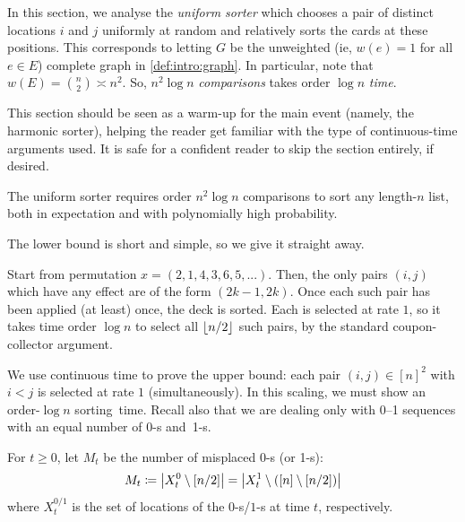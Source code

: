 \documentclass{article}
\begin{document}
In this section, we analyse the \textit{uniform sorter} which chooses a pair of distinct locations $i$ and $j$ uniformly at random and relatively sorts the cards at these positions.
This corresponds to letting $G$ be the unweighted (ie, $w(e) = 1$ for all $e \in E$) complete graph in \cref{def:intro:graph}.
In particular, note that $w(E) = \binom n2 \asymp n^2$.
So, $n^2 \log n$ \emph{comparisons} takes order $\log n$ \emph{time}.

This section should be seen as a warm-up for the main event (namely, the harmonic sorter), helping the reader get familiar with the type of continuous-time arguments used.
It is safe for a confident reader to skip the section entirely, if desired.

\begin{thm}
\label{res:unif:sorting-time}
The uniform sorter
requires order $n^2 \log n$ comparisons to sort any length-$n$ list,
both in expectation and with polynomially high probability.
\end{thm}

The lower bound is short and simple, so we give it straight away.

\begin{Proof}
Start from permutation $x = (2, 1, 4, 3, 6, 5, ...)$.
Then, the only pairs $(i,j)$ which have any effect are of the form $(2k-1, 2k)$. Once each such pair has been applied (at least) once, the deck is sorted.
Each is selected at rate $1$, so it takes time order $\log n$ to select all $\lfloor n/2 \rfloor$ such pairs, by the standard coupon-collector argument.
\end{Proof}

We use continuous time to prove the upper bound:
	each pair $(i,j) \in [n]^2$ with $i < j$ is selected at rate $1$ (simultaneously).
In this scaling, we must show an order-$\log n$ sorting~time.
Recall also that we are dealing only with 0--1 sequences with an equal number of 0-s and~1-s.

\begin{defn}
For $t \ge 0$,
let $M_t$ be the number of misplaced 0-s (or 1-s):
\[
	M_t
\coloneqq
	\bigl|  X_t^0 \setminus [n/2]  \bigr|
=
	\bigl|  X_t^1 \setminus ([n] \setminus [n/2])  \bigr|
\]
where $X_t^{0/1}$ is the set of locations of the $0$-s/$1$-s at time $t$, respectively.
\end{defn}
\end{document}
